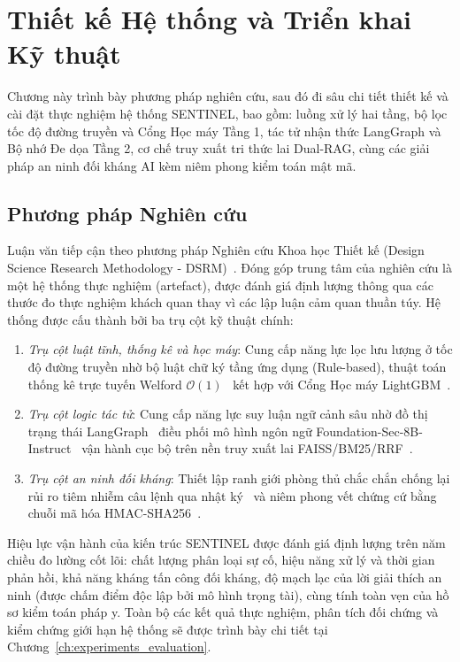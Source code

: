 \chapter{Thiết kế Hệ thống và Triển khai Kỹ thuật}
\label{ch:system_design_implementation}

Chương này trình bày phương pháp nghiên cứu, sau đó đi sâu chi tiết thiết kế và cài đặt thực nghiệm hệ thống SENTINEL, bao gồm: luồng xử lý hai tầng, bộ lọc tốc độ đường truyền và Cổng Học máy Tầng 1, tác tử nhận thức LangGraph và Bộ nhớ Đe dọa Tầng 2, cơ chế truy xuất tri thức lai Dual-RAG, cùng các giải pháp an ninh đối kháng AI kèm niêm phong kiểm toán mật mã.

\section{Phương pháp Nghiên cứu}
\label{sec:methodology}

Luận văn tiếp cận theo phương pháp Nghiên cứu Khoa học Thiết kế (Design Science Research Methodology - DSRM)~\cite{peffers2007}. Đóng góp trung tâm của nghiên cứu là một hệ thống thực nghiệm (artefact), được đánh giá định lượng thông qua các thước đo thực nghiệm khách quan thay vì các lập luận cảm quan thuần túy. Hệ thống được cấu thành bởi ba trụ cột kỹ thuật chính:
\begin{enumerate}[leftmargin=*,label=\arabic*.]
    \item \textit{Trụ cột luật tĩnh, thống kê và học máy}: Cung cấp năng lực lọc lưu lượng ở tốc độ đường truyền nhờ bộ luật chữ ký tầng ứng dụng (Rule-based), thuật toán thống kê trực tuyến Welford $\mathcal{O}(1)$~\cite{welford1962} kết hợp với Cổng Học máy LightGBM~\cite{ke2017lightgbm}.
    \item \textit{Trụ cột logic tác tử}: Cung cấp năng lực suy luận ngữ cảnh sâu nhờ đồ thị trạng thái LangGraph~\cite{langgraph2024} điều phối mô hình ngôn ngữ Foundation-Sec-8B-Instruct~\cite{foundation_sec_instruct} vận hành cục bộ trên nền truy xuất lai FAISS/BM25/RRF~\cite{faiss2019, bm25_2009, rrf2009}.
    \item \textit{Trụ cột an ninh đối kháng}: Thiết lập ranh giới phòng thủ chắc chắn chống lại rủi ro tiêm nhiễm câu lệnh qua nhật ký~\cite{promptinjection2023, owasp_llm2025} và niêm phong vết chứng cứ bằng chuỗi mã hóa HMAC-SHA256~\cite{hmac1997}.
\end{enumerate}

Hiệu lực vận hành của kiến trúc SENTINEL được đánh giá định lượng trên năm chiều đo lường cốt lõi: chất lượng phân loại sự cố, hiệu năng xử lý và thời gian phản hồi, khả năng kháng tấn công đối kháng, độ mạch lạc của lời giải thích an ninh (được chấm điểm độc lập bởi mô hình trọng tài), cùng tính toàn vẹn của hồ sơ kiểm toán pháp y. Toàn bộ các kết quả thực nghiệm, phân tích đối chứng và kiểm chứng giới hạn hệ thống sẽ được trình bày chi tiết tại Chương~\ref{ch:experiments_evaluation}.

